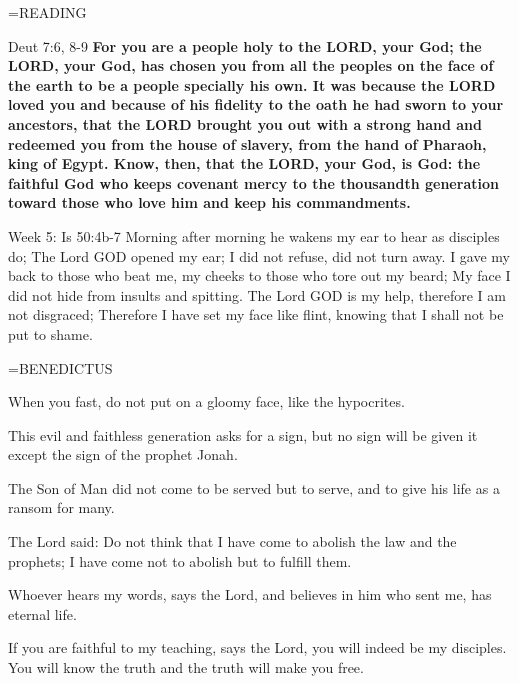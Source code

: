 \hangindent=\parindent \small READING
\begin{description}[labelindent=\parindent, leftmargin=*]
\item [Ash Wednesday \& Weeks 1-4:]     Deut 7:6, 8-9 \textbf{    For you are a people holy to the LORD, your God; the LORD, your God, has chosen you from all the peoples on the face of the earth to be a people specially his own. It was because the LORD loved you and because of his fidelity to the oath he had sworn to your ancestors, that the LORD brought you out with a strong hand and redeemed you from the house of slavery, from the hand of Pharaoh, king of Egypt. Know, then, that the LORD, your God, is God: the faithful God who keeps covenant mercy to the thousandth generation toward those who love him and keep his commandments.}
\end{description}

Week 5:    Is 50:4b-7    Morning after morning
he wakens my ear to hear as disciples do;
The Lord GOD opened my ear;
I did not refuse,
did not turn away.
I gave my back to those who beat me,
my cheeks to those who tore out my beard;
My face I did not hide
from insults and spitting.
The Lord GOD is my help,
therefore I am not disgraced;
Therefore I have set my face like flint,
knowing that I shall not be put to shame.

\hangindent=\parindent \small BENEDICTUS
\begin{description}[labelindent=\parindent, noitemsep, leftmargin=*]
\item [Ash Wednesday:] 	When you fast, do not put on a gloomy face, like the hypocrites.
\item [Week 1:] 	This evil and faithless generation asks for a sign, but no sign will be given it except the sign of the prophet Jonah.
\item [Week 2:] 	The Son of Man did not come to be served but to serve, and to give his life as a ransom for many.
\item [Week 3:] 	The Lord said: Do not think that I have come to abolish the law and the prophets; I have come not to abolish but to fulfill them.
\item [Week 4:] 	Whoever hears my words, says the Lord, and believes in him who sent me, has eternal life.
\item [Week 5:] 	If you are faithful to my teaching, says the Lord, you will indeed be my disciples. You will know the truth and the truth will make you free.
\end{description}

